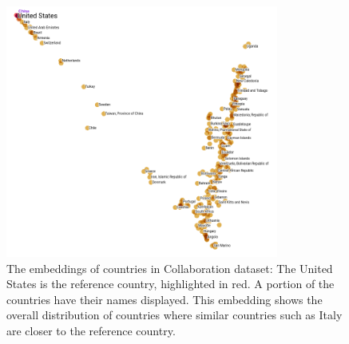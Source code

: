 \documentclass[11pt,twocolumn]{article}
\begin{document}
\begin{figure}[!ht]\centering
	\includegraphics[width=0.8\textwidth]{countries-annotation}
	\caption{
		The embeddings of countries in Collaboration dataset:
		The United States is the reference country, highlighted in red.
		A portion of the countries have their names displayed.
		This embedding shows the overall distribution of countries where similar countries such as Italy are closer to the reference country.
	}
	\label{fig:countries}
\end{figure}
\end{document}
